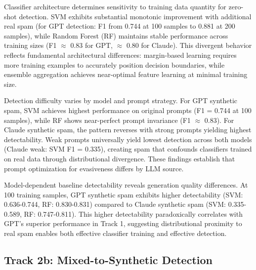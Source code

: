 Classifier architecture determines sensitivity to training data quantity for zero-shot detection. SVM exhibits substantial monotonic improvement with additional real spam (for GPT detection: F1 from 0.744 at 100 samples to 0.881 at 200 samples), while Random Forest (RF) maintains stable performance across training sizes (F1 $\approx$ 0.83 for GPT, $\approx$ 0.80 for Claude). This divergent behavior reflects fundamental architectural differences: margin-based learning requires more training examples to accurately position decision boundaries, while ensemble aggregation achieves near-optimal feature learning at minimal training size.

Detection difficulty varies by model and prompt strategy. For GPT synthetic spam, SVM achieves highest performance on original prompts (F1 = 0.744 at 100 samples), while RF shows near-perfect prompt invariance (F1 $\approx$ 0.83). For Claude synthetic spam, the pattern reverses with strong prompts yielding highest detectability. Weak prompts universally yield lowest detection across both models (Claude weak: SVM F1 = 0.335), creating spam that confounds classifiers trained on real data through distributional divergence. These findings establish that prompt optimization for evasiveness differs by LLM source.

Model-dependent baseline detectability reveals generation quality differences. At 100 training samples, GPT synthetic spam exhibits higher detectability (SVM: 0.636-0.744, RF: 0.830-0.831) compared to Claude synthetic spam (SVM: 0.335-0.589, RF: 0.747-0.811). This higher detectability paradoxically correlates with GPT's superior performance in Track 1, suggesting distributional proximity to real spam enables both effective classifier training and effective detection.


\subsection{Track 2b: Mixed-to-Synthetic Detection}
\label{sec:eval:track2b}


